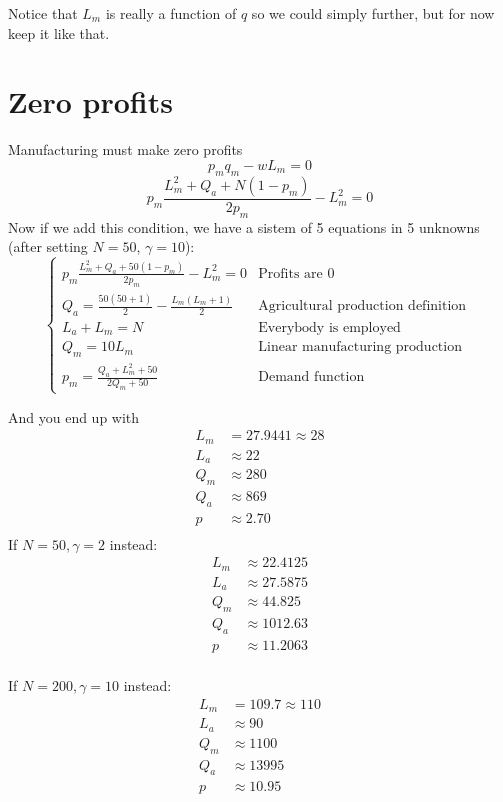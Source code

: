 \documentclass[]{article}
\begin{document}
Notice that $L_m$ is really a function of $q$ so we could simply further, but for now keep it like that.

\section{Zero profits}
Manufacturing must make zero profits
\[ p_m q_m - w L_m = 0\]
\[ p_m \frac{L^2_m + Q_a +N(1 - p_m)}{2p_m} - L^2_m = 0\]
Now if we add this condition, we have a sistem of 5 equations in 5 unknowns (after setting $N=50$, $\gamma=10$):
\[
\begin{cases}  p_m \frac{L^2_m + Q_a +50(1 - p_m)}{2p_m} - L^2_m = 0 & \text{Profits are 0 }
\\ Q_a =  \frac{50(50+1)}{2} - \frac{L_m(L_m+1)}{2} & \text{Agricultural production definition } \\
 L_a + L_m = N &\text{Everybody is employed } \\ 
Q_m = 10 L_m &\text{Linear manufacturing production } \\
p_m = \frac{Q_a + L_m^2 + 50}{2 Q_m + 50} &\text{Demand function }
 \end{cases} 
\]

And you end up with
\begin{align*}
L_m &= 27.9441 \approx 28 \\
L_a &\approx 22 \\
Q_m &\approx 280 \\
Q_a &\approx 869 \\
p &\approx 2.70 \\
\end{align*}
If $N=50,\gamma=2$ instead:
\begin{align*}
L_m & \approx 22.4125 \\
L_a &\approx 27.5875 \\
Q_m &\approx 44.825 \\
Q_a &\approx 1012.63 \\
p &\approx 11.2063 \\
\end{align*}

If $N=200,\gamma=10$ instead:
\begin{align*}
L_m &= 109.7 \approx 110 \\
L_a &\approx 90 \\
Q_m &\approx 1100 \\
Q_a &\approx 13995 \\
p &\approx 10.95 \\
\end{align*}
\end{document}
